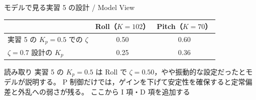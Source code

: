 \begin{frame}{モデルで見る実習 5 の設計 / Model View}
  \begin{table}
    \centering\small
    \begin{tabular}{lcc}
      \hline
      & \textbf{Roll（$K=102$）} & \textbf{Pitch（$K=70$）} \\
      \hline
      実習 5 の $K_p=0.5$ での $\zeta$ & 0.50 & 0.60 \\
      $\zeta=0.7$ 設計の $K_p$     & 0.25 & 0.36 \\
      \hline
    \end{tabular}
  \end{table}

  \vspace{0.5em}

  \begin{exampleblock}{読み取り}
    \footnotesize
    実習 5 の $K_p=0.5$ は Roll で $\zeta=0.50$，やや振動的な設定だったとモデルが説明する。
    P 制御だけでは，ゲインを下げて安定性を確保すると定常偏差と外乱への弱さが残る。
    ここから I 項・D 項を追加する
  \end{exampleblock}
\end{frame}

